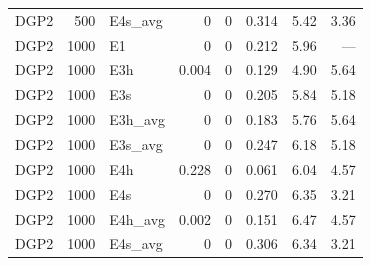 \begin{scriptsize}
\begin{longtable}{lrl*{5}{r}}
DGP2 & 500 & E4s\_avg & 0 & 0 & 0.314 & 5.42 & 3.36 \\
\addlinespace
DGP2 & 1000 & E1 & 0 & 0 & 0.212 & 5.96 & --- \\
DGP2 & 1000 & E3h & 0.004 & 0 & 0.129 & 4.90 & 5.64 \\
DGP2 & 1000 & E3s & 0 & 0 & 0.205 & 5.84 & 5.18 \\
DGP2 & 1000 & E3h\_avg & 0 & 0 & 0.183 & 5.76 & 5.64 \\
DGP2 & 1000 & E3s\_avg & 0 & 0 & 0.247 & 6.18 & 5.18 \\
DGP2 & 1000 & E4h & 0.228 & 0 & 0.061 & 6.04 & 4.57 \\
DGP2 & 1000 & E4s & 0 & 0 & 0.270 & 6.35 & 3.21 \\
DGP2 & 1000 & E4h\_avg & 0.002 & 0 & 0.151 & 6.47 & 4.57 \\
DGP2 & 1000 & E4s\_avg & 0 & 0 & 0.306 & 6.34 & 3.21 \\
\end{longtable}
\end{scriptsize}
